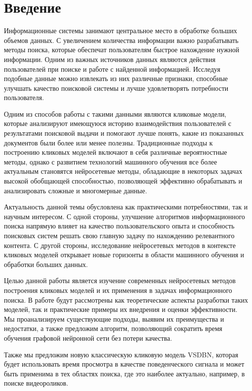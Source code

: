 \documentclass[diploma]{nanolab2015}
\begin{document}

\setcounter{page}{3}
\clearpage
\tableofcontents{}  %
\clearpage
\chapter{Введение}
Информационные системы занимают центральное место в обработке больших объемов данных. С увеличением количества информации важно разрабатывать методы поиска, которые обеспечат пользователям быстрое нахождение нужной информации. Одним из важных источников данных являются действия пользователей при поиске и работе с найденной информацией. Исследуя подобные данные можно извлекать из них различные признаки, способные улучшать качество поисковой системы и лучше удовлетворять потребности пользователя.

Одним из способов работы с такими данными являются кликовые модели, которые анализируют имеющуюся историю взаимодействия пользователей с результатами поисковой выдачи и помогают лучше понять, какие из показанных документов были более или менее полезны. Традиционные подходы к построению кликовых моделей включают в себя различные вероятностные методы, однако с развитием технологий машинного обучения все более актуальным становятся нейросетевые методы, обладающие в некоторых задачах высокой обобщающей способностью, позволяющей эффективно обрабатывать и анализировать сложные и многомерные данные.

Актуальность данной темы обусловлена как практическими потребностями, так и научным интересом. С одной стороны, улучшение алгоритмов информационного поиска напрямую влияет на качество пользовательского опыта и способность поисковых систем решать свою главную задачу по нахождению релевантного контента. С другой стороны, исследование нейросетевых методов в контексте кликовых моделей открывает новые горизонты в области машинного обучения и обработки больших данных.

Целью данной работы является изучение современных нейросетевых методов построения кликовых моделей и их применения в задачах информационного поиска. В работе будут рассмотрены как теоретические аспекты разработки таких моделей, так и практические примеры их внедрения и оценки эффективности. Мы проанализируем существующие подходы, выявим их преимущества и недостатки, а также предложим алгоритм, позволяющий сократить время обучения графовой нейронной сети без потери качества.

Также мы предложим новую классическую кликовую модель VSDBN, которая будет использовать время просмотра в качестве поведенческого сигнала и может быть применима в тех областях поиска, где это наиболее актуально, например, в поиске видеороликов. 
\newpage
\end{document}
